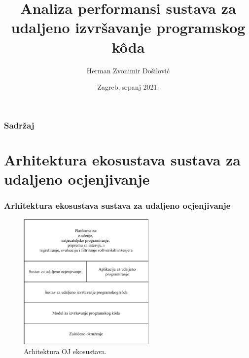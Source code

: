 \documentclass{beamer}
\title[Diplomski rad br.\ 2565]{Analiza performansi sustava za udaljeno izvršavanje programskog kôda}
\author{Herman Zvonimir Došilović}
\institute[FER]{Sveučilište u Zagrebu Fakultet elektrotehnike i računarstva}
\date{Zagreb, srpanj 2021.}
\newif\ifplacelogo
\begin{document}
\frame{\titlepage}

\begin{frame}
\frametitle{Sadržaj}
\tableofcontents
\end{frame}

\section{Arhitektura ekosustava sustava za udaljeno ocjenjivanje}
\begin{frame}
\frametitle{Arhitektura ekosustava sustava za udaljeno ocjenjivanje}
\begin{figure}[htb]
	\centering
	\includegraphics[width=0.6\textwidth]{images/Ekosustav.pdf}
	\caption{Arhitektura OJ ekosustava. \citep{9245310}}
\end{figure}
\end{frame}


\end{document}
